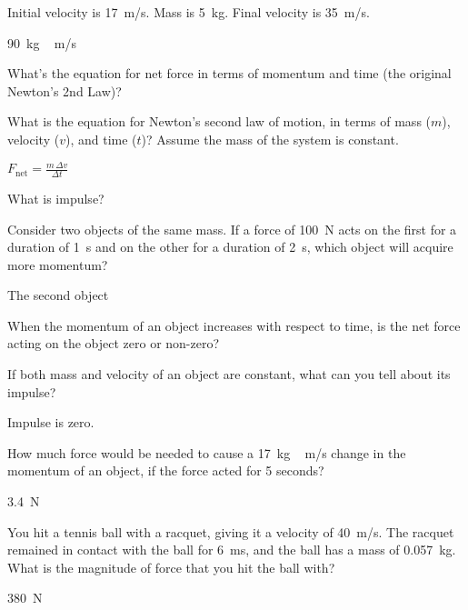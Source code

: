 \documentclass[../main-physics-problems.tex]{subfiles}
\begin{document}
\begin{questions}
\question \label{4phY3A}
Initial velocity is \SI{17}{m/s}. Mass is \SI{5}{kg}. Final velocity is \SI{35}{m/s}. 

\begin{solution}
\SI{90}{kg\,m/s}
\end{solution}


\question
What's the equation for net force in terms of momentum and time (the original Newton's 2nd Law)?


\question \label{9CaNPq}
What is the equation for Newton's second law of motion, in terms of mass ($m$), velocity ($v$), and time ($t$)? Assume the mass of the system is constant.

\begin{solution}
$F_{\text{net}} = \frac{m\,\Delta v}{\Delta t}$
\end{solution}

\question
What is impulse?


\question \label{6HJcp6}
Consider two objects of the same mass. If a force of \SI{100}{N}  acts on the first for a duration of \SI{1}{s}  and on the other for a duration of \SI{2}{s}, which object will acquire more momentum?

\begin{solution}
The second object
\end{solution}


\question
When the momentum of an object increases with respect to time, is the net force acting on the object zero or non-zero?


\question \label{ukvCcg}
If both mass and velocity of an object are constant, what can you tell about its impulse?

\begin{solution}
Impulse is zero.
\end{solution}


\question \label{dAVKAB}
How much force would be needed to cause a \SI{17}{kg\,m/s} change in the momentum of an object, if the force acted for 5 seconds?

\begin{solution}
\SI{3.4}{N}
\end{solution}


\question \label{R5mamD}
You hit a tennis ball with a racquet, giving it a velocity of \SI{40}{m/s}. The racquet remained in contact with the ball for \SI{6}{ms}, and the ball has a mass of \SI{0.057}{kg}. What is the magnitude of force that you hit the ball with?

\begin{solution}
\SI{380}{N}
\end{solution}



\end{questions}
\end{document}
